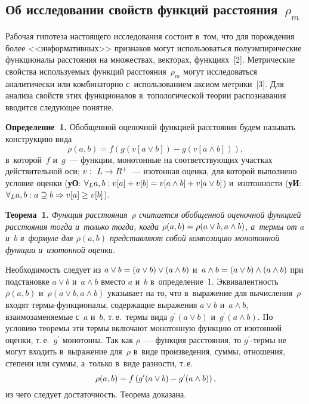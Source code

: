 \begin{multicols}{2}
\section{Об исследовании свойств функций расстояния~$\rho_m$}

    Рабочая гипотеза настоящего исследования со\-сто\-ит в~том, что для 
порождения более <<информативных>> признаков могут использоваться 
полуэмпирические функционалы расстояния на \mbox{множествах}, векторах, 
функциях~[2]. Метрические свойства ис\-поль\-зу\-емых функций 
расстояния~$\rho_m$ могут исследоваться аналитически или комбинаторно 
с~использованием аксиом метрики~[3]. Для анализа свойств этих 
функционалов в~топологической теории распознавания вводится следующее 
понятие.

\smallskip

\noindent
\textbf{Определение~1.} Обобщенной оценочной функцией расстояния 
будем называть конструкцию вида 
$$
\rho(a,b) = f(g ( v[a\vee b]) - g(v[a\wedge b])),
$$
 в~которой~$f$ и~$g$~--- функции, монотонные на 
соответствующих участках действительной оси; $v:\ L\hm\to R^+$~--- 
изотонная оценка, для которой выполнено условие оценки (\textbf{уО}: $\forall_L 
a,b: v[a]\hm+v[b]\hm= v[a \wedge b]\hm+ v[a\vee b]$) и~изотонности 
(\textbf{уИ}:  $\forall_L a,b: a\supseteq b \hm\Rightarrow v[a]\hm\geq v[b]$). 

\smallskip

\noindent
\textbf{Теорема~1.} \textit{Функция расстояния~$\rho$ считается 
обобщенной оценочной функцией расстояния тогда и~только тогда, когда 
$\rho(a,b)\hm= \rho(a\vee b, a\wedge b)$, а~термы от $a$ и~$b$ в~формуле для 
$\rho(a,b)$ представляют собой композицию монотонной функции 
и~изотонной оценки}. 

\smallskip

Необходимость следует из  $a\vee b\hm= (a\vee b)\vee (a\wedge b)$ и~$a\wedge b \hm= (a\vee b) \wedge (a\wedge b)$  при 
подстановке $a\vee b$ и~$a\wedge b$ вместо $a$ и~$b$ в~определение~1. 
Эквивалентность $\rho(a,b)$ и~$\rho(a\vee b, a\wedge b)$ указывает на то, что 
в~выражение для вычисления~$\rho$ входят тер\-мы-функ\-ци\-о\-на\-лы, 
содержащие выражения $a\vee b$ и~$a\wedge b$, взаимозаменяемые с~$a$ 
и~$b$, т.\,е.\ термы вида $g^\prime (a\vee b)$ и~$g^\prime(a\wedge b)$. По 
условию теоремы эти термы включают монотонную функцию от изотонной 
оценки, т.\,е.~$g^\prime$ монотонна. Так как $\rho$~--- функция расстояния, 
то $g^\prime$-тер\-мы не могут входить в~выражение для~$\rho$ в~виде 
произведения, суммы, отношения, степени или суммы, а~только в~виде 
разности, т.\,е.\
$$
\rho(a,b) = f\left(g^\prime(a\vee b) \hm- g^\prime (a\wedge b)\right),
$$ 
из чего следует достаточность. Теорема доказана.


\end{multicols}
